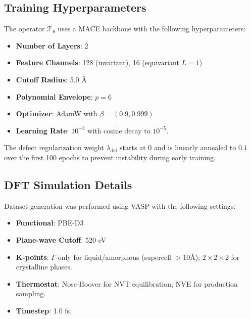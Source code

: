 \documentclass{article}
\begin{document}
\subsection{Training Hyperparameters}
The operator $\mathcal{T}_\theta$ uses a MACE backbone with the following hyperparameters:
\begin{itemize}
    \item \textbf{Number of Layers}: 2
    \item \textbf{Feature Channels}: 128 (invariant), 16 (equivariant $L=1$)
    \item \textbf{Cutoff Radius}: 5.0 \AA{}
    \item \textbf{Polynomial Envelope}: $p=6$
    \item \textbf{Optimizer}: AdamW with $\beta=(0.9, 0.999)$
    \item \textbf{Learning Rate}: $10^{-3}$ with cosine decay to $10^{-5}$.
\end{itemize}
The defect regularization weight $\lambda_\text{def}$ starts at 0 and is linearly annealed to $0.1$ over the first 100 epochs to prevent instability during early training.

\subsection{DFT Simulation Details}
Dataset generation was performed using VASP with the following settings:
\begin{itemize}
    \item \textbf{Functional}: PBE-D3
    \item \textbf{Plane-wave Cutoff}: 520 eV
    \item \textbf{K-points}: $\Gamma$-only for liquid/amorphous (supercell $> 10$\AA{}); $2\times2\times2$ for crystalline phases.
    \item \textbf{Thermostat}: Nose-Hoover for NVT equilibration; NVE for production sampling.
    \item \textbf{Timestep}: 1.0 fs.
\end{itemize}
\end{document}
